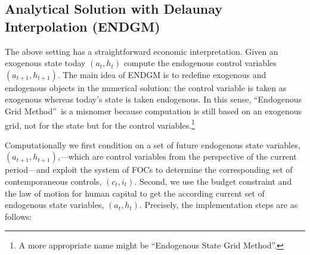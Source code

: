 \documentclass[a4paper,12pt]{article}%
\begin{document}
\subsection{Analytical Solution with Delaunay Interpolation \newline(ENDGM)}

\label{ss:analendgm}

The above setting has a straightforward economic interpretation. Given an
exogenous state today $\left(  a_{t},h_{t}\right)  $ compute the endogenous
control variables $\left(  a_{t+1},h_{t+1}\right)  $. The main idea of ENDGM
is to redefine exogenous and endogenous objects in the numerical solution: the
control variable is taken as exogenous whereas today's state is taken
endogenous. In this sense, \textquotedblleft Endogenous Grid
Method\textquotedblright\ is a misnomer because computation is still based on
an exogenous grid, not for the state but for the control variables.\footnote{A
more appropriate name might be \textquotedblleft Endogenous State Grid
Method\textquotedblright.}

Computationally we first condition on a set of future endogenous state
variables, $\left(  a_{t+1},h_{t+1}\right)  $,---which are control variables
from the perspective of the current period---and exploit the system of FOCs to
determine the corresponding set of contemporaneous controls, $\left(
c_{t},i_{t}\right)  $. Second, we use the budget constraint and the law of
motion for human capital to get the according current set of endogenous state
variables, $\left(  a_{t},h_{t}\right)  $. Precisely, the implementation steps
are as follows:
\end{document}
